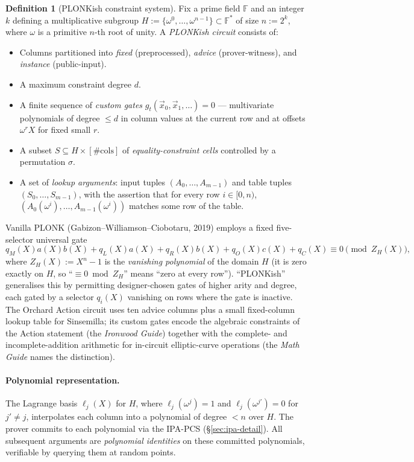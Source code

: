 \documentclass[11pt,a4paper]{article}
\theoremstyle{definition}
\newtheorem{definition}[theorem]{Definition}
\newcommand{\F}{\mathbb{F}}
\begin{document}
\begin{definition}[PLONKish constraint system]\label{def:plonkish}
Fix a prime field $\F$ and an integer $k$ defining a multiplicative
subgroup $H := \{\omega^0, \dots, \omega^{n-1}\} \subset \F^*$ of size
$n := 2^k$, where $\omega$ is a primitive $n$-th root of unity. A
\emph{PLONKish circuit} consists of:
\begin{itemize}[leftmargin=*]
\item Columns partitioned into \emph{fixed} (preprocessed),
\emph{advice} (prover-witness), and \emph{instance} (public-input).
\item A maximum constraint degree $d$.
\item A finite sequence of \emph{custom gates}
$g_t(\vec x_0, \vec x_1, \dots) = 0$ --- multivariate polynomials of
degree $\le d$ in column values at the current row and at offsets
$\omega^r X$ for fixed small $r$.
\item A subset $S \subseteq H \times [\#\text{cols}]$ of
\emph{equality-constraint cells} controlled by a permutation $\sigma$.
\item A set of \emph{lookup arguments}: input tuples $(A_0, \dots, A_{m-1})$
and table tuples $(S_0, \dots, S_{m-1})$, with the assertion that for
every row $i \in [0, n)$, $(A_0(\omega^i), \dots, A_{m-1}(\omega^i))$
matches some row of the table.
\end{itemize}
\end{definition}

Vanilla PLONK (Gabizon--Williamson--Ciobotaru, 2019) employs a fixed five-selector
universal gate
\[
q_M(X) a(X) b(X) + q_L(X) a(X) + q_R(X) b(X) + q_O(X) c(X) + q_C(X) \equiv 0 \pmod{Z_H(X)},
\]
where $Z_H(X) := X^n - 1$ is the \emph{vanishing polynomial} of the domain
$H$ (it is zero exactly on $H$, so ``$\equiv 0 \bmod Z_H$'' means ``zero at
every row''). ``PLONKish'' generalises this by permitting designer-chosen
gates of higher arity and degree, each gated by a selector $q_i(X)$
vanishing on rows where the gate is inactive. The Orchard Action circuit
uses ten advice columns plus a small fixed-column lookup table for
Sinsemilla; its custom gates encode the algebraic constraints of the
Action statement (the \emph{Ironwood Guide}) together with the
complete- and incomplete-addition arithmetic for in-circuit
elliptic-curve operations (the \emph{Math Guide} names the distinction).

\paragraph{Polynomial representation.}
The Lagrange basis $\ell_j(X)$ for $H$, where $\ell_j(\omega^j) = 1$
and $\ell_j(\omega^{j'}) = 0$ for $j' \ne j$, interpolates each column into
a polynomial of degree $< n$ over $H$. The prover commits to each
polynomial via the IPA-PCS (\S\ref{sec:ipa-detail}). All subsequent
arguments are \emph{polynomial identities} on these committed polynomials,
verifiable by querying them at random points.
\end{document}
